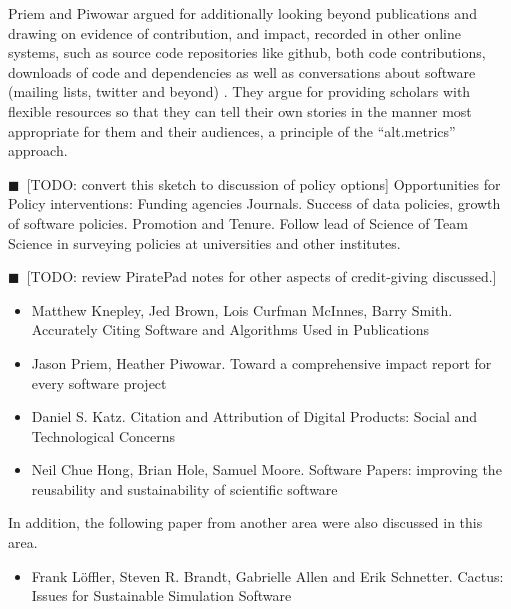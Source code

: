 \documentclass[11pt, oneside]{amsart}
\newcommand{\todo}[1]{{\color{blue}$\blacksquare$~\textsf{[TODO: #1]}}}
\begin{document}
Priem and Piwowar argued for additionally looking beyond publications and drawing on evidence of contribution, and impact, recorded in other online systems, such as source code repositories like github, both code contributions, downloads of code and dependencies as well as conversations about software (mailing lists, twitter and beyond) \cite{Priem_WSSSPE}. They argue for providing scholars with flexible resources so that they can tell their own stories in the manner most appropriate for them and their audiences, a principle of the ``alt.metrics'' approach.

\todo{convert this sketch to discussion of policy options}	
	Opportunities for Policy interventions:
		Funding agencies
		Journals.  Success of data policies, growth of software policies.
		Promotion and Tenure. Follow lead of Science of Team Science in surveying policies at universities and other institutes.

\todo{review PiratePad notes for other aspects of credit-giving discussed.}
\begin{itemize}

\item Matthew Knepley, Jed Brown, Lois Curfman McInnes, Barry
  Smith. Accurately Citing Software and Algorithms Used in
  Publications \cite{Knepley_WSSSPE}

\item Jason Priem, Heather Piwowar. Toward a comprehensive impact
  report for every software project \cite{Priem_WSSSPE}

\item Daniel S. Katz. Citation and Attribution of Digital Products:
  Social and Technological Concerns \cite{Katz2_WSSSPE}

\item Neil Chue Hong, Brian Hole, Samuel Moore. Software Papers:
  improving the reusability and sustainability of scientific software
  \cite{Chue_Hong_WSSSPE}

\end{itemize}

In addition, the following paper from another area were also discussed
in this area.

\begin{itemize}

\item Frank L\"{o}ffler, Steven R. Brandt, Gabrielle Allen and Erik
  Schnetter. Cactus: Issues for Sustainable Simulation Software
  \cite{Loffler_WSSSPE}

\end{itemize}
\end{document}
